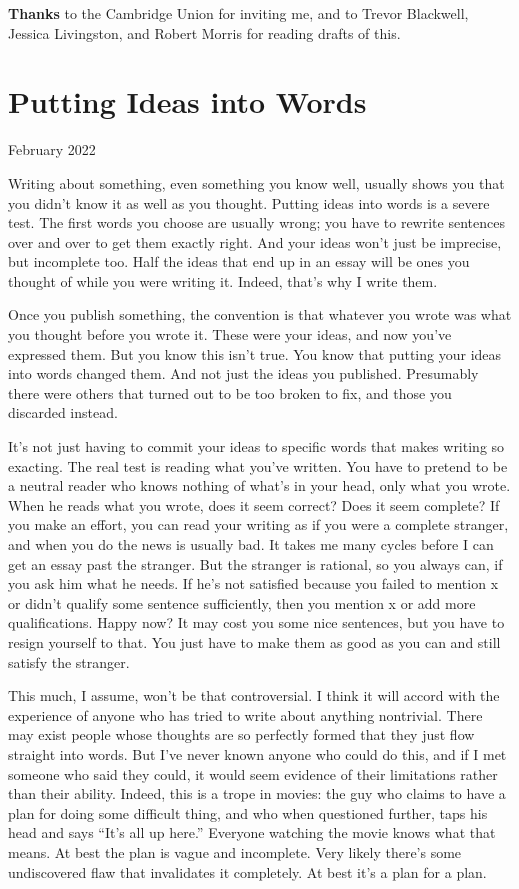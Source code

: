 \documentclass[12pt]{book}
\begin{document}
\textbf{Thanks} to the Cambridge Union for inviting me, and to Trevor
Blackwell, Jessica Livingston, and Robert Morris for reading drafts of
this.
\chapter{Putting Ideas into Words}

February 2022

Writing about something, even something you know well, usually shows you
that you didn't know it as well as you thought. Putting ideas into words
is a severe test. The first words you choose are usually wrong; you have
to rewrite sentences over and over to get them exactly right. And your
ideas won't just be imprecise, but incomplete too. Half the ideas that
end up in an essay will be ones you thought of while you were writing
it. Indeed, that's why I write them.

Once you publish something, the convention is that whatever you wrote
was what you thought before you wrote it. These were your ideas, and now
you've expressed them. But you know this isn't true. You know that
putting your ideas into words changed them. And not just the ideas you
published. Presumably there were others that turned out to be too broken
to fix, and those you discarded instead.

It's not just having to commit your ideas to specific words that makes
writing so exacting. The real test is reading what you've written. You
have to pretend to be a neutral reader who knows nothing of what's in
your head, only what you wrote. When he reads what you wrote, does it
seem correct? Does it seem complete? If you make an effort, you can read
your writing as if you were a complete stranger, and when you do the
news is usually bad. It takes me many cycles before I can get an essay
past the stranger. But the stranger is rational, so you always can, if
you ask him what he needs. If he's not satisfied because you failed to
mention x or didn't qualify some sentence sufficiently, then you mention
x or add more qualifications. Happy now? It may cost you some nice
sentences, but you have to resign yourself to that. You just have to
make them as good as you can and still satisfy the stranger.

This much, I assume, won't be that controversial. I think it will accord
with the experience of anyone who has tried to write about anything
nontrivial. There may exist people whose thoughts are so perfectly
formed that they just flow straight into words. But I've never known
anyone who could do this, and if I met someone who said they could, it
would seem evidence of their limitations rather than their ability.
Indeed, this is a trope in movies: the guy who claims to have a plan for
doing some difficult thing, and who when questioned further, taps his
head and says ``It's all up here.'' Everyone watching the movie knows
what that means. At best the plan is vague and incomplete. Very likely
there's some undiscovered flaw that invalidates it completely. At best
it's a plan for a plan.
\end{document}
